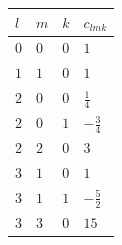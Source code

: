 \begin{center}
\begin{tabular}{llll}
\hline
$l$ & $m$ & $k$ & $c_{lmk}$ \\
\hline
$0$ & $0$ & $0$ & $1$ \\
$1$ & $1$ & $0$ & $1$ \\
$2$ & $0$ & $0$ & $\frac{1}{4}$ \\
$2$ & $0$ & $1$ & $- \frac{3}{4}$ \\
$2$ & $2$ & $0$ & $3$ \\
$3$ & $1$ & $0$ & $1$ \\
$3$ & $1$ & $1$ & $- \frac{5}{2}$ \\
$3$ & $3$ & $0$ & $15$ \\
\hline
\end{tabular}
\end{center}
